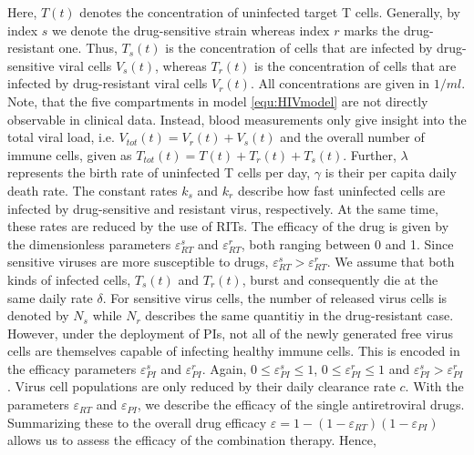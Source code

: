 Here, $T(t)$ denotes the concentration of uninfected target T cells.
Generally, by index $s$ we denote the drug-sensitive strain whereas index $r$ marks the drug-resistant one.
Thus, $T_s(t)$ is the concentration of cells that are infected by drug-sensitive viral cells $V_s(t)$, whereas $T_r(t)$ is the concentration of cells that are infected by drug-resistant viral cells $V_r(t)$.
All concentrations are given in $1/ml$.
Note, that the five compartments in model \ref{equ:HIVmodel} are not directly observable in clinical data.
Instead, blood measurements only give insight into the total viral load, i.e. $V_{tot}(t) = V_r(t) + V_s(t)$ and the overall number of 
immune cells, given as $T_{tot}(t) = T(t) + T_r(t) + T_s(t)$.\newline
Further, $\lambda$ represents the birth rate of uninfected T cells per day, $\gamma$ is their per capita daily death rate.
The constant rates $k_s$ and $k_r$ describe how fast uninfected cells are infected by drug-sensitive and resistant virus, respectively.
At the same time, these rates are reduced by the use of RITs. The efficacy of the drug is given by the dimensionless 
parameters $\varepsilon_{RT}^{s}$ and $\varepsilon_{RT}^{r}$, both ranging between 0 and 1.
Since sensitive viruses are more susceptible to drugs, $\varepsilon_{RT}^{s} > \varepsilon_{RT}^{r}$.\newline
We assume that both kinds of infected cells, $T_s(t)$ and $T_r(t)$, burst and consequently die at the same daily rate $\delta$.
For sensitive virus cells, the number of released virus cells is denoted by $N_s$ 
while $N_r$ describes the same quantitiy in the drug-resistant case.
However, under the deployment of PIs, not all of the newly generated free virus cells are themselves capable of infecting healthy immune 
cells. This is encoded in the efficacy parameters $\varepsilon_{PI}^s$ and $\varepsilon_{PI}^r$. Again, $0 \leq \varepsilon_{PI}^s \leq 1$, 
$0 \leq \varepsilon_{PI}^r \leq 1$ and $\varepsilon_{PI}^s > \varepsilon_{PI}^r$.
Virus cell populations are only reduced by their daily clearance rate $c$.\newline
With the parameters $\varepsilon_{RT}$ and $\varepsilon_{PI}$, we describe the efficacy of the single antiretroviral drugs.
Summarizing these to the overall drug efficacy $\varepsilon = 1 - (1-\varepsilon_{RT})(1-\varepsilon_{PI})$ allows us to assess the efficacy of 
the combination therapy.
Hence,


